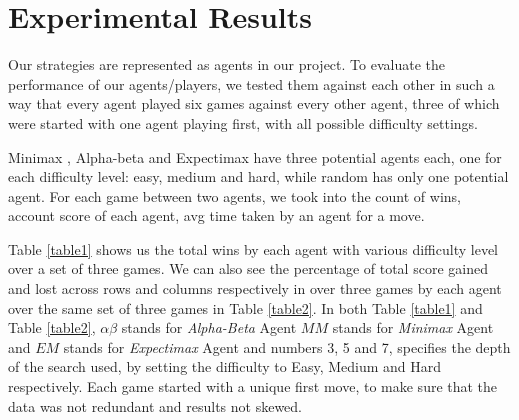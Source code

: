 \documentclass{svproc}
\begin{document}
\section{Experimental Results}\label{4}

Our strategies are represented as agents in our project. To evaluate the performance of our agents/players, we tested them against each other in such a way that every agent played six games against every other agent, three of which were started with one agent playing first, with all possible difficulty settings.

Minimax , Alpha-beta and Expectimax have three potential agents each, one for each difficulty level: easy, medium and hard, while random has only one potential agent. For each game between two agents, we took into the count of wins, account score of each agent, avg time taken by an agent for a move.

Table \ref{table1} shows us the total wins by each agent with various difficulty level over a set of three games. We can also see the percentage of total score gained and lost across rows and columns respectively in over three games by each agent over the same set of three games in Table \ref{table2}. In both Table \ref{table1} and Table \ref{table2}, $\alpha\beta$ stands for \emph{Alpha-Beta} Agent  $MM$ stands for \emph{Minimax} Agent and $EM$ stands for \emph{Expectimax} Agent and numbers 3, 5 and 7, specifies the depth of the search used, by setting the difficulty to Easy, Medium and Hard respectively. Each game started with a unique first move, to make sure that the data was not redundant and results not skewed.
\end{document}
